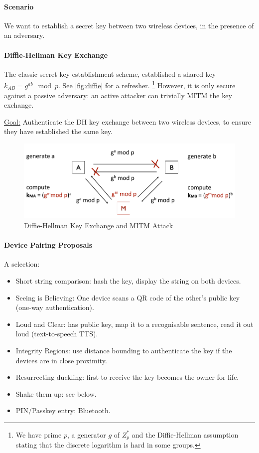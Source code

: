 \paragraph{Scenario}
We want to establish a secret key between two wireless devices, in the presence of an adversary.

\paragraph{Diffie-Hellman Key Exchange}
The classic secret key establishment scheme, established a shared key $k_{AB} = g^{ab} \mod p$.
See \autoref{fig:diffie} for a refresher.%
\footnote{We have prime $p$, a generator $g$ of $Z^*_p$ and the Diffie-Hellman assumption stating that the discrete logarithm is hard in some groups.}
However, it is only secure against a passive adversary:
an active attacker can trivially MITM the key exchange.

\underline{Goal:} Authenticate the DH key exchange between two wireless devices, to ensure they have established the same key.

\begin{figure}[h]
	\centering
	\includegraphics[scale=0.45]{images/8-diffie.png}
	\caption{Diffie-Hellman Key Exchange and MITM Attack}%
	\label{fig:diffie}
\end{figure}

\paragraph{Device Pairing Proposals}
A selection:
\begin{itemize}
	\item Short string comparison: hash the key, display the string on both devices.
	\item Seeing is Believing: One device scans a QR code of the other's public key (one-way authentication).
	\item Loud and Clear: has public key, map it to a recognisable sentence, read it out loud (text-to-speech TTS).
	\item Integrity Regions: use distance bounding to authenticate the key if the devices are in close proximity.
	\item Resurrecting duckling: first to receive the key becomes the owner for life.
	\item Shake them up: see below.
	\item PIN/Passkey entry: Bluetooth.
\end{itemize}

